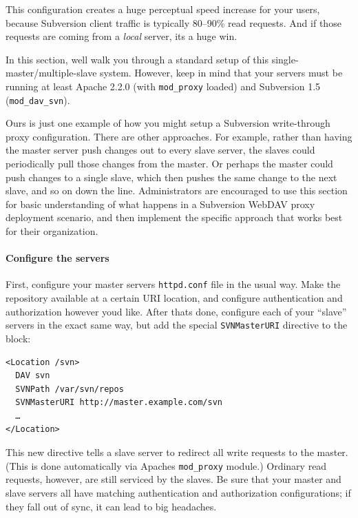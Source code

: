 This configuration creates a huge perceptual speed increase for your
users, because Subversion client traffic is typically 80--90\% read
requests. And if those requests are coming from a \emph{local} server,
it\textquotesingle s a huge win.

In this section, we\textquotesingle ll walk you through a standard setup
of this single-master/multiple-slave system. However, keep in mind that
your servers must be running at least Apache 2.2.0 (with
\texttt{mod\_proxy} loaded) and Subversion 1.5 (\texttt{mod\_dav\_svn}).

Ours is just one example of how you might setup a Subversion
write-through proxy configuration. There are other approaches. For
example, rather than having the master server push changes out to every
slave server, the slaves could periodically pull those changes from the
master. Or perhaps the master could push changes to a single slave,
which then pushes the same change to the next slave, and so on down the
line. Administrators are encouraged to use this section for basic
understanding of what happens in a Subversion WebDAV proxy deployment
scenario, and then implement the specific approach that works best for
their organization.

\paragraph{Configure the
servers}\label{svn.serverconfig.httpd.extra.writethruproxy.configure}

First, configure your master server\textquotesingle s
\texttt{httpd.conf} file in the usual way. Make the repository available
at a certain URI location, and configure authentication and
authorization however you\textquotesingle d like. After
that\textquotesingle s done, configure each of your ``slave'' servers in
the exact same way, but add the special \texttt{SVNMasterURI} directive
to the block:

\begin{verbatim}
<Location /svn>
  DAV svn
  SVNPath /var/svn/repos
  SVNMasterURI http://master.example.com/svn
  …
</Location>
\end{verbatim}

This new directive tells a slave server to redirect all write requests
to the master. (This is done automatically via Apache\textquotesingle s
\texttt{mod\_proxy} module.) Ordinary read requests, however, are still
serviced by the slaves. Be sure that your master and slave servers all
have matching authentication and authorization configurations; if they
fall out of sync, it can lead to big headaches.

